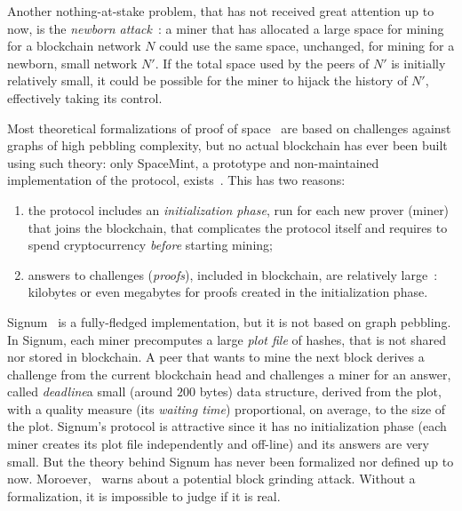 Another nothing-at-stake problem, that has not received great attention up to now,
is the \emph{newborn attack}~\cite{TangZDWLG0L19}: a miner that has allocated a large space
for mining for a blockchain network $N$ could use the same space, unchanged, for
mining for a newborn, small network $N'$. If the total space used by the peers of $N'$ is
initially relatively small, it could be possible for the miner to hijack the history of $N'$,
effectively taking its control.

Most theoretical formalizations of proof of space~\cite{AtenieseBFG14,DziembowskiFKP15,RenD16} are
based on challenges against graphs of high pebbling complexity, but
no actual blockchain has ever been built using such theory: only SpaceMint, a prototype and non-maintained
implementation of the protocol, exists~\cite{ParkKFGAP18}. This has two reasons:
%
\begin{enumerate}
\item the protocol includes an \emph{initialization phase},
  run for each new prover (miner) that joins the blockchain,
  that complicates the protocol itself and
  requires to spend cryptocurrency \emph{before}
  starting mining;
\item answers to challenges (\emph{proofs}),
  included in blockchain, are relatively large~\cite{AbusalahACKPR17}:
  kilobytes or even megabytes for proofs created in the initialization phase.
\end{enumerate}

Signum~\cite{Signum} is a fully-fledged implementation, but it is not based on graph pebbling.
In Signum, each miner precomputes a large \emph{plot file} of hashes, that is not shared nor
stored in blockchain.
A peer that wants to mine the next block derives a challenge from the current blockchain head
and challenges a miner for an answer, called
\emph{deadline}\ie a small (around $200$ bytes) data structure, derived from the plot,
with a quality measure
(its \emph{waiting time}) proportional, on average, to the size of the plot.
Signum's protocol is attractive since it has no initialization phase (each miner creates its plot file
independently and off-line) and its answers are very small.
But the theory behind Signum has never been formalized nor defined up to now.
Moroever, \cite{ParkKFGAP18}~warns about a potential block grinding attack.
Without a formalization, it is impossible to judge if it is real.

